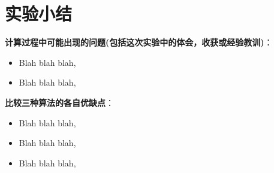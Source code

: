 \documentclass[UTF8]{ctexart}
\begin{document}
\section{实验小结}
    \textbf{计算过程中可能出现的问题(包括这次实验中的体会，收获或经验教训)}：
    \begin{itemize}
        \item  Blah blah blah,
        \item  Blah blah blah,
    \end{itemize}

    \textbf{比较三种算法的各自优缺点}：
    \begin{itemize}
        \item  Blah blah blah,
        \item  Blah blah blah,
        \item Blah blah blah,
    \end{itemize}
\end{document}
